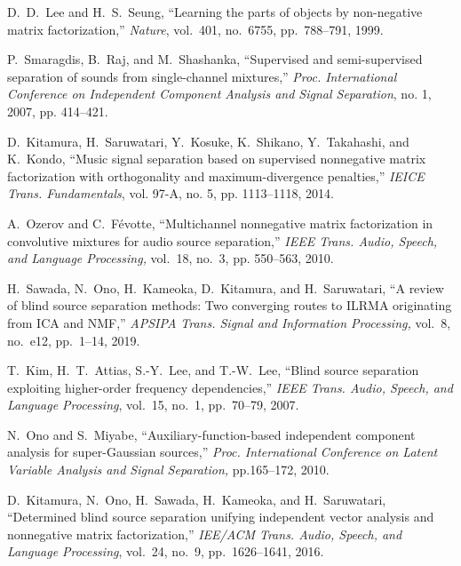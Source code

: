 \documentclass[honka]{nitkagawathesis}%
\begin{document}
\begin{thebibliography}{99}
  D.~D.~Lee and H.~S.~Seung,
  ``Learning the parts of objects by non-negative matrix factorization,''
  {\em Nature}, vol.~401, no.~6755, pp.~788--791, 1999.
  
  P.~Smaragdis, B.~Raj, and M.~Shashanka, 
  ``Supervised and semi-supervised separation of sounds from single-channel mixtures,''  
  {\em Proc. International Conference on Independent Component Analysis and Signal Separation}, no. 1, 2007, pp. 414–421.
  
  D.~Kitamura, H.~Saruwatari, Y.~Kosuke, K.~Shikano, Y.~Takahashi, and K.~Kondo, 
  ``Music signal separation based on supervised nonnegative matrix factorization with orthogonality and maximum-divergence penalties,'' 
  {\em IEICE Trans. Fundamentals}, vol. 97-A, no. 5, pp. 1113–1118, 2014.
  
  A.~Ozerov and C.~Févotte,
  ``Multichannel nonnegative matrix factorization in convolutive mixtures for audio source separation,'' 
  {\em IEEE Trans. Audio, Speech, and Language Processing,} vol.~18, no.~3, pp. 550--563, 2010.
  
  H.~Sawada, N.~Ono, H.~Kameoka, D.~Kitamura, and H.~Saruwatari, ``A review of blind source separation methods: Two converging routes to ILRMA originating from ICA and NMF,'' 
  {\em APSIPA Trans. Signal and Information Processing,} vol.~8, no.~e12, pp.~1--14, 2019.

  T.~Kim, H.~T.~Attias, S.-Y.~Lee, and T.-W.~Lee, ``Blind source separation exploiting higher-order frequency dependencies,'' 
  {\em IEEE Trans. Audio, Speech, and Language Processing}, vol.~15, no.~1, pp.~70--79, 2007.

  N.~Ono and S.~Miyabe, ``Auxiliary-function-based independent component analysis for super-Gaussian sources,'' 
  {\em Proc. International Conference on Latent Variable Analysis and Signal Separation,} pp.165--172, 2010.
    
  D.~Kitamura, N.~Ono, H.~Sawada, H.~Kameoka, and H.~Saruwatari,
  ``Determined blind source separation unifying independent vector analysis and nonnegative matrix factorization,'' 
  {\em IEE/ACM Trans. Audio, Speech, and Language Processing}, vol.~24, no.~9, pp.~1626--1641, 2016.


\end{thebibliography}
\end{document}
